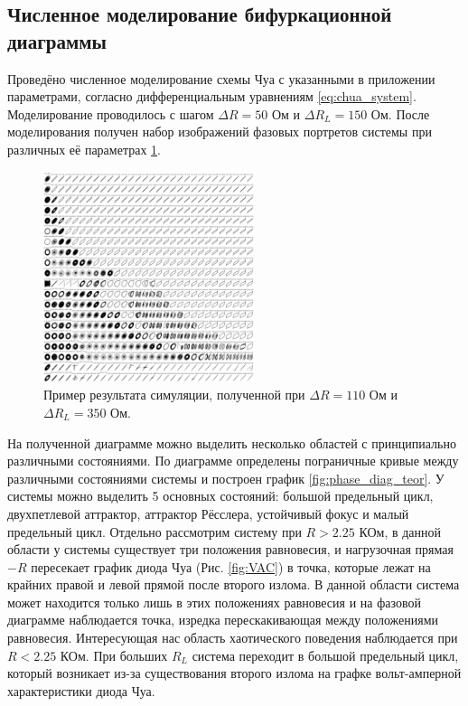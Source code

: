 \documentclass[12pt]{article}
\begin{document}
\subsection*{Численное моделирование бифуркационной диаграммы}
Проведёно численное моделирование схемы Чуа с указанными в приложении параметрами, согласно дифференциальным уравнениям \ref{eq:chua_system}. 
Моделирование проводилось с шагом $\Delta R = 50$ Ом и $\Delta R_L = 150$ Ом. После моделирования получен набор 
изображений фазовых портретов системы при различных её параметрах \ref{fig:simulation}.
\begin{figure}[H]
	\centering
	\includegraphics[width=0.55\textwidth]{sim_ex.png}
	\caption{Пример результата симуляции, полученной при $\Delta R = 110$ Ом и $\Delta R_L = 350$ Ом.}
	\label{fig:simulation}
\end{figure}
На полученной диаграмме можно выделить несколько областей с принципиально различными состояниями. 
По диаграмме определены пограничные кривые между различными состояниями системы и построен график \ref{fig:phase_diag_teor}. 
У системы можно выделить 5 основных состояний: большой предельный цикл, двухпетлевой аттрактор, аттрактор Рёсслера, устойчивый фокус и 
малый предельный цикл. 
Отдельно рассмотрим систему при $R > 2.25$ КОм, в данной области у системы существует три положения равновесия, и нагрузочная 
прямая $-R$ пересекает график диода Чуа (Рис. \ref{fig:VAC}) в точка, которые лежат на крайних правой и левой прямой после второго излома. 
В данной области система может находится только лишь в этих положениях равновесия и на фазовой диаграмме наблюдается точка, изредка 
перескакивающая между положениями равновесия. 
Интересующая нас область хаотического поведения наблюдается при $R < 2.25$ КОм. При больших $R_L$ система переходит 
в большой предельный цикл, который возникает из-за существования второго излома на графке вольт-амперной характеристики диода Чуа. 
\end{document}
